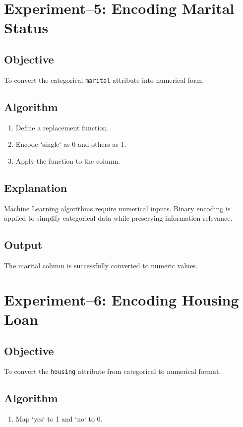 \documentclass[11pt]{article}
\begin{document}
\section{Experiment--5: Encoding Marital Status}

\subsection*{Objective}
To convert the categorical \texttt{marital} attribute into numerical form.

\subsection*{Algorithm}
\begin{enumerate}
    \item Define a replacement function.
    \item Encode `single` as 0 and others as 1.
    \item Apply the function to the column.
\end{enumerate}

\subsection*{Explanation}
Machine Learning algorithms require numerical inputs. Binary encoding is applied to simplify categorical data while preserving information relevance.

\subsection*{Output}
The marital column is successfully converted to numeric values.

\section{Experiment--6: Encoding Housing Loan}

\subsection*{Objective}
To convert the \texttt{housing} attribute from categorical to numerical format.

\subsection*{Algorithm}
\begin{enumerate}
    \item Map `yes` to 1 and `no` to 0.
\end{enumerate}
\end{document}
